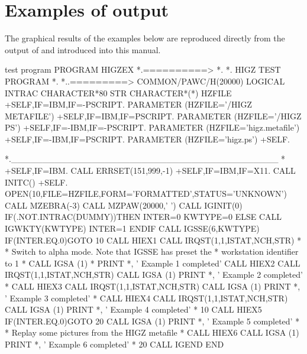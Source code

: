 
\chapter{Examples of \HIGZ{} output}

The graphical results of the examples below are reproduced directly 
from the \PS{} output of and introduced into this manual.

\begin{XMPt}{\HIGZ{} test program}
      PROGRAM HIGZEX
*.==========>
*.
*.           HIGZ TEST PROGRAM
*.
*..=========>
      COMMON/PAWC/H(20000)
      LOGICAL INTRAC
      CHARACTER*80 STR
      CHARACTER*(*) HZFILE
+SELF,IF=IBM,IF=-PSCRIPT.
      PARAMETER (HZFILE='/HIGZ METAFILE')
+SELF,IF=IBM,IF=PSCRIPT.
      PARAMETER (HZFILE='/HIGZ PS')
+SELF,IF=-IBM,IF=-PSCRIPT.
      PARAMETER (HZFILE='higz.metafile')
+SELF,IF=-IBM,IF=PSCRIPT.
      PARAMETER (HZFILE='higz.ps')
+SELF.

*.___________________________________________
*
+SELF,IF=IBM.
      CALL ERRSET(151,999,-1)
+SELF,IF=IBM,IF=X11.
      CALL INITC()
+SELF.
      OPEN(10,FILE=HZFILE,FORM='FORMATTED',STATUS='UNKNOWN')
      CALL MZEBRA(-3)
      CALL MZPAW(20000,' ')
      CALL IGINIT(0)
      IF(.NOT.INTRAC(DUMMY))THEN
         INTER=0
         KWTYPE=0
      ELSE
         CALL IGWKTY(KWTYPE)
         INTER=1
      ENDIF
      CALL IGSSE(6,KWTYPE)
      IF(INTER.EQ.0)GOTO 10
      CALL HIEX1
      CALL IRQST(1,1,ISTAT,NCH,STR)
*
*          Switch to alpha mode. Note that IGSSE has preset the
*          workstation identifier to 1
*
      CALL IGSA (1)
*
      PRINT *, ' Example 1 completed'
      CALL HIEX2
      CALL IRQST(1,1,ISTAT,NCH,STR)
      CALL IGSA (1)
      PRINT *, ' Example 2 completed'
*
      CALL HIEX3
      CALL IRQST(1,1,ISTAT,NCH,STR)
      CALL IGSA (1)
      PRINT *, ' Example 3 completed'
*
      CALL HIEX4
      CALL IRQST(1,1,ISTAT,NCH,STR)
      CALL IGSA (1)
      PRINT *, ' Example 4 completed'
*
  10  CALL HIEX5
      IF(INTER.EQ.0)GOTO 20
      CALL IGSA (1)
      PRINT *, ' Example 5 completed'
*
*          Replay some pictures from the HIGZ metafile
*
      CALL HIEX6
      CALL IGSA (1)
      PRINT *, ' Example 6 completed'
*
  20  CALL IGEND
      END
\end{XMPt}

